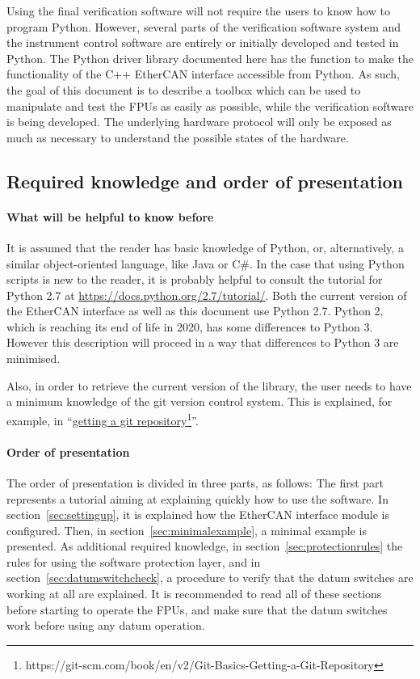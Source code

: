 \documentclass[11pt,a4paper]{report}
\begin{document}
Using the final verification software will not require the users to
know how to program Python.  However, several parts of the
verification software system and the instrument control software are
entirely or initially developed and tested in Python.  The Python
driver library documented here has the function to make the
functionality of the C++ EtherCAN interface accessible from Python. As
such, the goal of this document is to describe a toolbox which can be
used to manipulate and test the FPUs as easily as possible, while the
verification software is being developed. The underlying hardware
protocol will only be exposed as much as necessary to understand the
possible states of the hardware.



\subsection{Required knowledge and order of presentation}

\paragraph{What will be helpful to know before}
It is assumed that the reader has basic knowledge of Python, or,
alternatively, a similar object-oriented language, like Java or C\#.
In the case that using Python scripts is new to the reader, it is
probably helpful to consult the tutorial for Python 2.7 at
\url{https://docs.python.org/2.7/tutorial/}.  Both the current version
of the EtherCAN interface as well as this document use Python 2.7. Python 2, which
is reaching its end of life in 2020, has some differences to Python
3. However this description will proceed in a way that differences to
Python 3 are minimised.

Also, in order to retrieve the current version of the library, the
user needs to have a minimum knowledge of the git version control
system. This is explained, for example, in
``\href{https://git-scm.com/book/en/v2/Git-Basics-Getting-a-Git-Repository}{getting
  a git repository}\footnote{https://git-scm.com/book/en/v2/Git-Basics-Getting-a-Git-Repository}''.

\paragraph{Order of presentation}
The order of presentation is divided in three parts, as follows: The
first part represents a tutorial aiming at explaining quickly how to
use the software. In section~\ref{sec:settingup}, it is explained how
the EtherCAN interface module is configured. Then, in
section~\ref{sec:minimalexample}, a minimal example is presented. As
additional required knowledge, in section~\ref{sec:protectionrules}
the rules for using the software protection layer, and in
section~\ref{sec:datumswitchcheck}, a procedure to verify that the
datum switches are working at all are explained. It is recommended to
read all of these sections before starting to operate the FPUs, and
make sure that the datum switches work before using any
datum operation.
\end{document}
